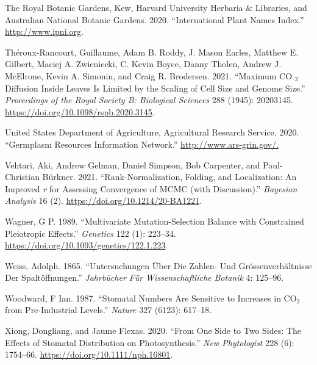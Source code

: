 \documentclass[
  12pt,
]{article}
\newlength{\cslhangindent}
\newlength{\cslentryspacingunit} %
\newenvironment{CSLReferences}[2] %
 {%
  \setlength{\parindent}{0pt}
  \ifodd #1
  \let\oldpar\par
  \def\par{\hangindent=\cslhangindent\oldpar}
  \fi
  \setlength{\parskip}{#2\cslentryspacingunit}
 }%
 {}
\begin{document}
\begin{CSLReferences}{1}{0}
\leavevmode{}%
The Royal Botanic Gardens, Kew, Harvard University Herbaria \& Libraries, and Australian National Botanic Gardens. 2020. {``International {Plant} {Names} {Index}.''} \url{http://www.ipni.org}.

\leavevmode{}%
Théroux-Rancourt, Guillaume, Adam B. Roddy, J. Mason Earles, Matthew E. Gilbert, Maciej A. Zwieniecki, C. Kevin Boyce, Danny Tholen, Andrew J. McElrone, Kevin A. Simonin, and Craig R. Brodersen. 2021. {``Maximum {CO} \(_{\textrm{2}}\) Diffusion Inside Leaves Is Limited by the Scaling of Cell Size and Genome Size.''} \emph{Proceedings of the Royal Society B: Biological Sciences} 288 (1945): 20203145. \url{https://doi.org/10.1098/rspb.2020.3145}.

\leavevmode{}%
United States Department of Agriculture, Agricultural Research Service. 2020. {``Germplasm {Resources} {Information} {Network}.''} \url{http://www.ars-grin.gov/.}

\leavevmode{}%
Vehtari, Aki, Andrew Gelman, Daniel Simpson, Bob Carpenter, and Paul-Christian Bürkner. 2021. {``Rank-{Normalization}, {Folding}, and {Localization}: {An} {Improved} \emph{r} for {Assessing} {Convergence} of {MCMC} (with {Discussion}).''} \emph{Bayesian Analysis} 16 (2). \url{https://doi.org/10.1214/20-BA1221}.

\leavevmode{}%
Wagner, G P. 1989. {``Multivariate Mutation-Selection Balance with Constrained Pleiotropic Effects.''} \emph{Genetics} 122 (1): 223--34. \url{https://doi.org/10.1093/genetics/122.1.223}.

\leavevmode{}%
Weiss, Adolph. 1865. {``Untersuchungen Über Die {Zahlen}- Und {Grössenverhältnisse} Der {Spaltöffnungen}.''} \emph{Jahrbücher Für Wissenschaftliche Botanik} 4: 125--96.

\leavevmode{}%
Woodward, F Ian. 1987. {``Stomatal Numbers Are Sensitive to Increases in {CO}\(_{\textrm{2}}\) from Pre-Industrial Levels.''} \emph{Nature} 327 (6123): 617--18.

\leavevmode{}%
Xiong, Dongliang, and Jaume Flexas. 2020. {``From One Side to Two Sides: The Effects of Stomatal Distribution on Photosynthesis.''} \emph{New Phytologist} 228 (6): 1754--66. \url{https://doi.org/10.1111/nph.16801}.


\end{CSLReferences}
\end{document}
